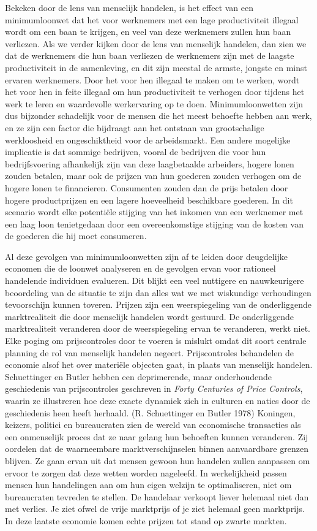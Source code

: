 \documentclass[
  a5paper,
  smalldemyvopaper,11pt,twoside,onecolumn,openright,extrafontsizes,
hidelinks]{memoir}
\begin{document}
Bekeken door de lens van menselijk handelen, is het effect van een
minimumloonwet dat het voor werknemers met een lage productiviteit
illegaal wordt om een baan te krijgen, en veel van deze werknemers
zullen hun baan verliezen. Als we verder kijken door de lens van
menselijk handelen, dan zien we dat de werknemers die hun baan verliezen
de werknemers zijn met de laagste productiviteit in de samenleving, en
dit zijn meestal de armste, jongste en minst ervaren werknemers. Door
het voor hen illegaal te maken om te werken, wordt het voor hen in feite
illegaal om hun productiviteit te verhogen door tijdens het werk te
leren en waardevolle werkervaring op te doen. Minimumloonwetten zijn dus
bijzonder schadelijk voor de mensen die het meest behoefte hebben aan
werk, en ze zijn een factor die bijdraagt aan het ontstaan van
grootschalige werkloosheid en ongeschiktheid voor de arbeidsmarkt. Een
andere mogelijke implicatie is dat sommige bedrijven, vooral de
bedrijven die voor hun bedrijfsvoering afhankelijk zijn van deze
laagbetaalde arbeiders, hogere lonen zouden betalen, maar ook de prijzen
van hun goederen zouden verhogen om de hogere lonen te financieren.
Consumenten zouden dan de prijs betalen door hogere productprijzen en
een lagere hoeveelheid beschikbare goederen. In dit scenario wordt elke
potentiële stijging van het inkomen van een werknemer met een laag loon
tenietgedaan door een overeenkomstige stijging van de kosten van de
goederen die hij moet consumeren.

Al deze gevolgen van minimumloonwetten zijn af te leiden door
deugdelijke economen die de loonwet analyseren en de gevolgen ervan voor
rationeel handelende individuen evalueren. Dit blijkt een veel nuttigere
en nauwkeurigere beoordeling van de situatie te zijn dan alles wat we
met wiskundige verhoudingen tevoorschijn kunnen toveren. Prijzen zijn
een weerspiegeling van de onderliggende marktrealiteit die door
menselijk handelen wordt gestuurd. De onderliggende marktrealiteit
veranderen door de weerspiegeling ervan te veranderen, werkt niet. Elke
poging om prijscontroles door te voeren is mislukt omdat dit soort
centrale planning de rol van menselijk handelen negeert. Prijscontroles
behandelen de economie alsof het over materiële objecten gaat, in plaats
van menselijk handelen. Schuettinger en Butler hebben een deprimerende,
maar onderhoudende geschiedenis van prijscontroles geschreven in
\emph{Forty Centuries of Price Controls}, waarin ze illustreren hoe deze
exacte dynamiek zich in culturen en naties door de geschiedenis heen
heeft herhaald. (R. Schuettinger en Butler 1978) Koningen, keizers,
politici en bureaucraten zien de wereld van economische transacties als
een onmenselijk proces dat ze naar gelang hun behoeften kunnen
veranderen. Zij oordelen dat de waarneembare marktverschijnselen binnen
aanvaardbare grenzen blijven. Ze gaan ervan uit dat mensen gewoon hun
handelen zullen aanpassen om ervoor te zorgen dat deze wetten worden
nageleefd. In werkelijkheid passen mensen hun handelingen aan om hun
eigen welzijn te optimaliseren, niet om bureaucraten tevreden te
stellen. De handelaar verkoopt liever helemaal niet dan met verlies. Je
ziet ofwel de vrije marktprijs of je ziet helemaal geen marktprijs. In
deze laatste economie komen echte prijzen tot stand op zwarte markten.
\end{document}

